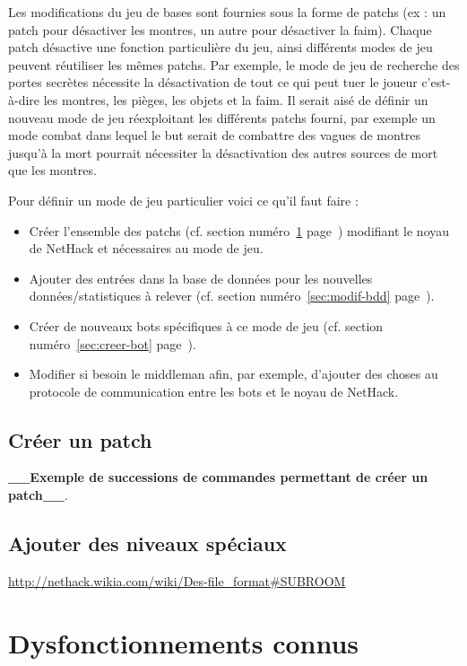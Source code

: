 \documentclass[10pt,a4paper]{report}
\begin{document}
Les modifications du jeu de bases sont fournies sous la forme de patchs (ex :
un patch pour désactiver les montres, un autre pour désactiver la faim).
Chaque patch désactive une fonction particulière du jeu, ainsi différents
modes de jeu peuvent réutiliser les mêmes patchs. Par exemple, le mode de jeu
de recherche des portes secrètes nécessite la désactivation de tout ce qui
peut tuer le joueur c'est-à-dire les montres, les pièges, les objets et la
faim. Il serait aisé de définir un nouveau mode de jeu réexploitant les
différents patchs fourni, par exemple un mode combat dans lequel le but serait
de combattre des vagues de montres jusqu'à la mort pourrait nécessiter la
désactivation des autres sources de mort que les montres.

Pour définir un mode de jeu particulier voici ce qu'il faut faire :
\begin{itemize}
	\item Créer l'ensemble des patchs (cf. section numéro~\ref{sec:creer-patch} page~\pageref{sec:creer-patch}) modifiant le noyau de NetHack et nécessaires au mode de jeu.
	\item Ajouter des entrées dans la base de données pour les nouvelles données/statistiques à relever (cf. section numéro~\ref{sec:modif-bdd} page~\pageref{sec:modif-bdd}).
	\item Créer de nouveaux bots spécifiques à ce mode de jeu (cf. section numéro~\ref{sec:creer-bot} page~\pageref{sec:creer-bot}).
	\item Modifier si besoin le middleman afin, par exemple, d'ajouter des choses au protocole de communication entre les bots et le noyau de NetHack.
\end{itemize}

\section{Créer un patch} \label{sec:creer-patch}

\textbf{\_\_Exemple de successions de commandes permettant de créer un patch\_\_}.

\section{Ajouter des niveaux spéciaux}

\url{http://nethack.wikia.com/wiki/Des-file\_format#SUBROOM}

\chapter{Dysfonctionnements connus}
\end{document}
